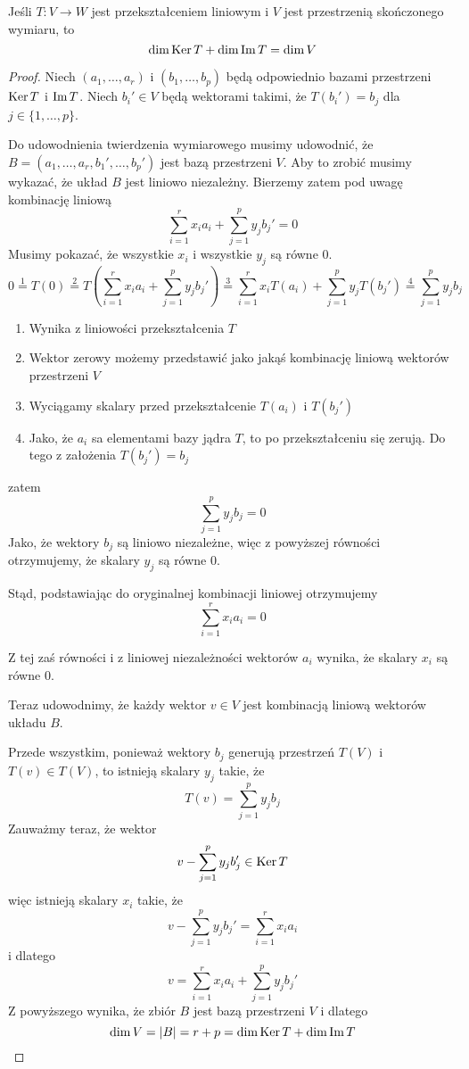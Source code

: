 \documentclass[a4paper,12pt]{article}
\begin{document}
\begin{theorem}
	Jeśli $T\colon V \to W$ jest przekształceniem liniowym i $V$ jest przestrzenią skończonego wymiaru, to
	\[
		\dim \operatorname{Ker} T + \dim \operatorname{Im} T = \dim V
	\] 
\end{theorem}
\begin{proof}
	Niech $(a_1,\dots,a_r)$ i $(b_1,\dots,b_p)$ będą odpowiednio bazami przestrzeni $\operatorname{Ker} T$ i $\operatorname{Im} T$. Niech $b_i' \in V$ będą wektorami takimi, że $T(b_i') = b_j$ dla $j \in \{1,\dots,p\}$.
	
	Do udowodnienia twierdzenia wymiarowego musimy udowodnić, że \\ $B = (a_1,\dots,a_r,b_1',\dots,b_p')$ jest bazą przestrzeni $V$. Aby to zrobić musimy wykazać, że układ $B$ jest liniowo niezależny. Bierzemy zatem pod uwagę kombinację liniową
	\[
		\sum_{i=1}^{r} x_i a_i + \sum_{j=1}^{p} y_j b_j' = 0
	\]
	Musimy pokazać, że wszystkie $x_i$ i wszystkie $y_j$ są równe $0$.
	\[
		0 
		\overset{1}{=} 
		T(0) 
		\overset{2}{=} 
		T\left( \sum_{i=1}^{r} x_i a_i + \sum_{j=1}^{p} y_j b_j' \right) 
		\overset{3}{=}
		\sum_{i=1}^{r} x_i T(a_i) + \sum_{j=1}^{p} y_j T(b_j') 
		\overset{4}{=}
		\sum_{j=1}^{p} y_j b_j
	\]
	\begin{note}
		\hfill
		\begin{enumerate}
			\item Wynika z liniowości przekształcenia $T$
			\item Wektor zerowy możemy przedstawić jako jakąś kombinację liniową wektorów przestrzeni $V$
			\item Wyciągamy skalary przed przekształcenie $T(a_i)$ i $T(b_j')$
			\item Jako, że $a_i$ sa elementami bazy jądra $T$, to po przekształceniu się zerują. Do tego z założenia $T(b_j') = b_j$ 
		\end{enumerate}
	\end{note}
	zatem 
	\[
		\sum_{j=1}^{p} y_j b_j = 0
	\]
	Jako, że wektory $b_j$ są liniowo niezależne, więc z powyższej równości otrzymujemy, że skalary $y_j$ są równe $0$.

	Stąd, podstawiając do oryginalnej kombinacji liniowej otrzymujemy
	\[
		\sum_{i=1}^{r} x_i a_i = 0
	\]

	Z tej zaś równości i z liniowej niezależności wektorów $a_i$ wynika, że skalary $x_i$ są równe $0$.

	Teraz udowodnimy, że każdy wektor $v \in V$ jest kombinacją liniową wektorów układu $B$.

	Przede wszystkim, ponieważ wektory $b_j$ generują przestrzeń $T(V)$ i $T(v) \in T(V)$, to istnieją skalary $y_j$ takie, że 
	\[
		T(v) = \sum_{j=1}^{p} y_j b_j
	\]
	Zauważmy teraz, że wektor 
	\[
		v - \sum_{j=1}^{p} y_j b_j' \in \operatorname{Ker} T
	\]
	więc istnieją skalary $x_i$ takie, że 
	\[
		v - \sum_{j=1}^{p} y_j b_j' = \sum_{i=1}^{r} x_i a_i
	\]
	i dlatego 
	\[
		v = \sum_{i=1}^{r} x_i a_i + \sum_{j=1}^{p} y_j b_j'
	\]
	Z powyższego wynika, że zbiór $B$ jest bazą przestrzeni $V$ i dlatego
	\[
		\dim V = |B| = r + p = \dim \operatorname{Ker} T + \dim \operatorname{Im} T
	\] 
\end{proof}
\end{document}
